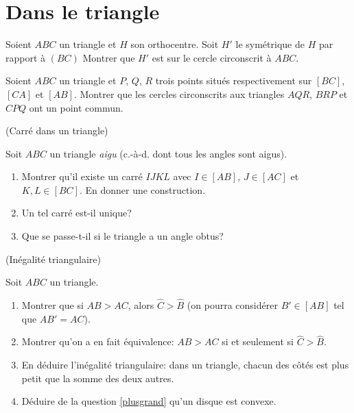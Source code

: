 \documentclass[a4paper,11pt,reqno]{amsart}
\begin{document}
\section{Dans le triangle}

\begin{exo}

  Soient $ABC$ un triangle et $H$  son orthocentre. Soit $H'$ le symétrique de $H$ par rapport à $(BC)$ Montrer que $H'$ est sur le cercle circonscrit à $ABC$.
\end{exo}

\begin{exo}

  Soient $ABC$ un triangle et $P$, $Q$, $R$ trois points situés respectivement sur $[BC]$, $[CA]$ et $[AB]$. Montrer que les cercles circonscrits aux triangles $AQR$, $BRP$ et $CPQ$ ont un point commun.
\end{exo}


\begin{exo} (Carré dans un  triangle)

  Soit $ABC$ un triangle \emph{aigu} (c.-à-d. dont tous les angles sont aigus).
  \begin{enumerate}
    \item Montrer qu'il existe un carré $IJKL$ avec $I \in [AB]$, $J \in [AC]$ et $K,L \in [BC]$. En donner une construction.
    \item Un tel carré est-il unique?
    \item Que se passe-t-il si le triangle a un angle obtus?
  \end{enumerate}
\end{exo}

\begin{exo} (Inégalité triangulaire)

  Soit $ABC$ un triangle.
  \begin{enumerate}
    \item \label{plusgrand} Montrer que si $AB > AC$, alors $\widehat{C}>\widehat{B}$ (on pourra considérer $B' \in [AB]$ tel que $AB'=AC$). %
    \item Montrer qu'on a en fait équivalence: $AB>AC$ si et seulement si $\widehat{C}>\widehat{B}$.
    \item En déduire l'inégalité triangulaire: dans un triangle, chacun des côtés est plus petit que la somme des deux autres.
    \item Déduire de la question \ref{plusgrand} qu'un disque est convexe.
  \end{enumerate}
\end{exo}
\end{document}
